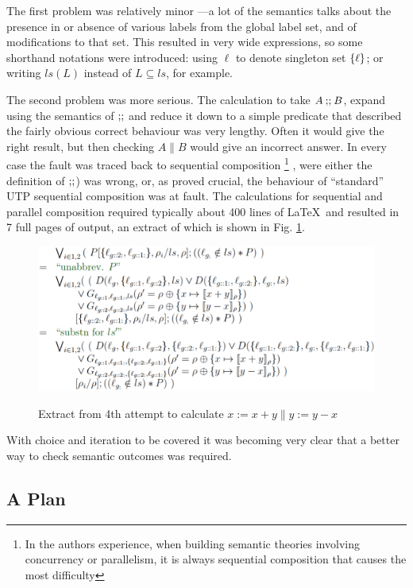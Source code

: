 The first problem was relatively minor
---a lot of the semantics talks about the presence in or absence of
various labels from the global label set, and of modifications to that set.
This resulted in very wide expressions,
so some shorthand notations were introduced:
using $\ell$ to denote singleton set $\{{\ell}\}$;
or writing $ls(L)$ instead of $L \subseteq ls$, for example.

The second problem was more serious.
The calculation to take $A \mathbin{\mathbf{;\!;}} B$, expand using the semantics of $\mathbin{\mathbf{;\!;}}$
and reduce it down to a simple predicate that described the fairly obvious
correct behaviour was very lengthy. Often it would give the right result,
but then checking $A \parallel B$ would give an incorrect answer.
In every case the fault was traced back to sequential composition%
\footnote{
In the authors experience,
when building semantic theories involving concurrency or parallelism,
it is always sequential composition that causes the most difficulty
}
,
were either the definition of $\mathbin{\mathbf{;\!;}}$) was wrong, or, as proved crucial,
the behaviour of ``standard'' UTP sequential composition
was at fault.
The calculations for sequential and parallel composition
required typically about 400 lines of \LaTeX\ and resulted
in 7 full pages of output,
an extract of which is shown in Fig. \ref{fig:attempt4}.

\begin{figure}
  \centering
  \includegraphics[width=6in]{Attempt4.eps}\\
  \caption{Extract from 4th attempt to calculate $x:=x+y \parallel y:=y-x$}
  \label{fig:attempt4}
\end{figure}

With choice and iteration to be covered
it was becoming very clear that a better way to check semantic outcomes
was required.

\subsection{A Plan}

